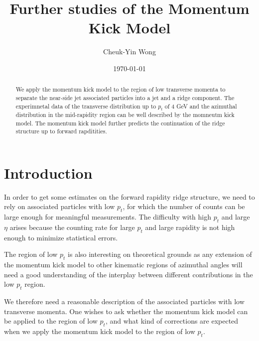\documentclass[showpacs,preprintnumbers,amsmath,amssymb,floatfix]{revtex4}
\begin{document}
\def\bbox#1{\hbox{\boldmath${#1}$}}
\def\blambda{{\hbox{\boldmath $\lambda$}}}
\def\eeta{{\hbox{\boldmath $\eta$}}}
\def\bxi{{\hbox{\boldmath $\xi$}}}
\def\bzeta{{\hbox{\boldmath $\zeta$}}}

\title{ 
Further studies of the Momentum Kick Model
}


\author{Cheuk-Yin Wong}
\date{\today}

\begin{abstract}

We apply the momentum kick model to the region of low transverse
momenta to separate the near-side jet associated particles into a jet
and a ridge component.  The experimnetal data of the transverse
distribution up to $p_t$ of 4 GeV and the azimuthal distribution in
the mid-rapidity region can be well described by the momneutm kick
model.  The momentum kick model further predicts the continuation of
the ridge structure up to forward rapditities.

\end{abstract}



\maketitle

\section{Introduction}

In order to get some estimates on the forward rapidity ridge
structure, we need to rely on associated particles with low $p_t$, for
which the number of counts can be large enough for meaningful
measurements.  The difficulty with high $p_t$ and large $\eta$ arises
because the counting rate for large $p_t$ and large rapidity is not
high enough to minimize statistical errors.  

The region of low $p_t$ is also interesting on theoretical grounds as
any extension of the momentum kick model to other kinematic regions of
azimuthal angles will need a good understanding of the interplay
between different contributions in the low $p_t$ region.

We therefore need a reasonable description of the associated particles
with low transverse momenta.  One wishes to ask whether the momentum
kick model can be applied to the region of low $p_t$, and what kind of
corrections are expected when we apply the momentum kick model to the
region of low $p_t$.
\end{document}
